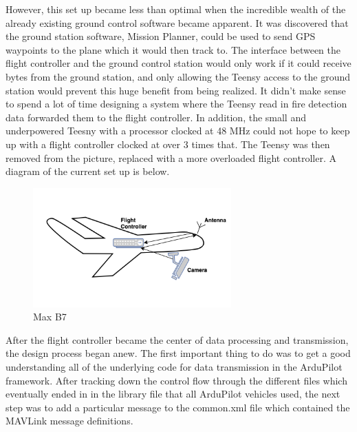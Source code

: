 \documentclass[12pt,journal,compsoc]{IEEEtran}
\begin{document}
However, this set up became less than optimal when the incredible wealth of the already existing ground control software became apparent. It was discovered that the ground station software, Mission Planner, could be used to send GPS waypoints to the plane which it would then track to. The interface between the flight controller and the ground control station would only work if it could receive bytes from the ground station, and only allowing the Teensy access to the ground station would prevent this huge benefit from being realized. 
It didn't make sense to spend a lot of time designing a system where the Teensy read in fire detection data forwarded them to the flight controller. In addition, the small and underpowered Teesny with a processor clocked at 48 MHz could not hope to keep up with a flight controller clocked at over 3 times that. The Teensy was then removed from the picture, replaced with a more overloaded flight controller. A diagram of the current set up is below.
\begin{figure}[h!]
\hspace*{0cm}
\centering
\includegraphics[width=3in]{Version2.png}
\caption{Max B7}
\label{version2}
\end{figure}

After the flight controller became the center of data processing and transmission, the design process began anew. The first important thing to do was to get a good understanding all of the underlying code for data transmission in the ArduPilot framework. After tracking down the control flow through the different files which eventually ended in in the library file that all ArduPilot vehicles used, the next step was to add a particular message to the common.xml file which contained the MAVLink message definitions. 
\end{document}
